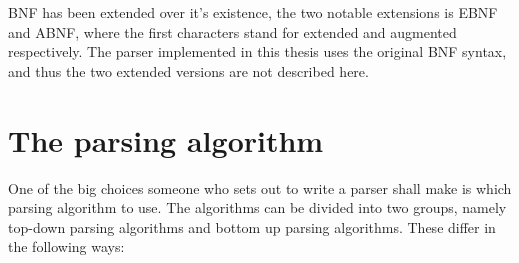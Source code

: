 BNF has been extended over it's existence, the two notable extensions is EBNF and ABNF, where the first characters stand for extended and augmented respectively. The parser implemented in this thesis uses the original BNF syntax, and thus the two extended versions are not described here.
\section{The parsing algorithm}
One of the big choices someone who sets out to write a parser shall make is which parsing algorithm to use. The algorithms can be divided into two groups, namely top-down parsing algorithms and bottom up parsing algorithms. These differ in the following ways:
